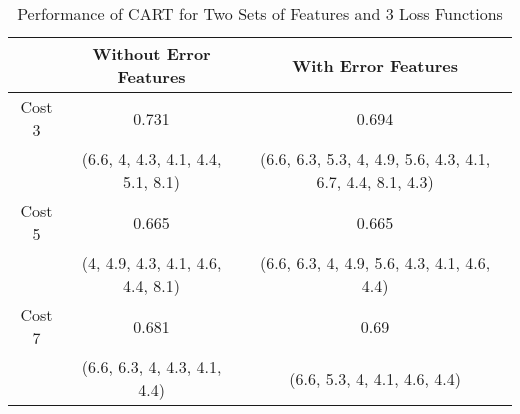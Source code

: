 \begin{table}[H]
\begin{center}
\begin{tabular}{ccc}
  & Without Error Features & With Error Features \\ 
  \hline
Cost 3 & 0.731 & 0.694 \\ 
   & (6.6, 4, 4.3, 4.1, 4.4, 5.1, 8.1) & (6.6, 6.3, 5.3, 4, 4.9, 5.6, 4.3, 4.1, 6.7, 4.4, 8.1, 4.3) \\ 
   \hline
Cost 5 & 0.665 & 0.665 \\ 
   & (4, 4.9, 4.3, 4.1, 4.6, 4.4, 8.1) & (6.6, 6.3, 4, 4.9, 5.6, 4.3, 4.1, 4.6, 4.4) \\ 
   \hline
Cost 7 & 0.681 & 0.69 \\ 
   & (6.6, 6.3, 4, 4.3, 4.1, 4.4) & (6.6, 5.3, 4, 4.1, 4.6, 4.4) \\ 
   \hline
\end{tabular}
\caption{Performance of CART for Two Sets of Features and 3 Loss Functions}
\label{tab:errors}
\end{center}
\end{table}
